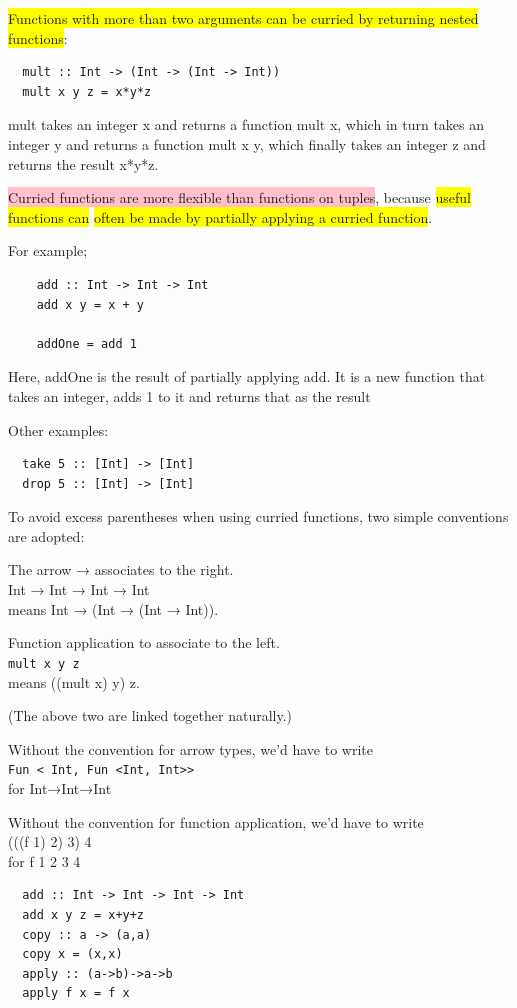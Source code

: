 \documentclass[tikz,border=10pt]{project_plan}
\begin{document}
\colorbox{yellow}{Functions with more than two arguments can be curried
  by returning nested functions}:
\begin{lstlisting}
  mult :: Int -> (Int -> (Int -> Int))
  mult x y z = x*y*z
\end{lstlisting}

mult takes an integer x and returns a function mult x,
which in turn takes an integer y and returns a function
mult x y, which finally takes an integer z and returns
the result x*y*z.

\colorbox{pink}{Curried functions are more flexible than functions on
  tuples}, because \colorbox{yellow}{useful functions can} \colorbox{yellow}{often be made by
  partially applying a curried function}.

For example;
\begin{lstlisting}
    add :: Int -> Int -> Int
    add x y = x + y

    addOne = add 1
\end{lstlisting}
Here, addOne is the result of partially applying add. It is a new function that
takes an integer, adds 1 to it and returns that as the result

Other examples:
\begin{lstlisting}
  take 5 :: [Int] -> [Int]
  drop 5 :: [Int] -> [Int]
\end{lstlisting}

To avoid excess parentheses when using curried functions,
two simple conventions are adopted:

The arrow → associates to the right.\\
Int → Int → Int → Int\\
means Int → (Int → (Int → Int)).

Function application to associate to the left.\\
\lstinline|mult x y z|\\
means ((mult x) y) z.

(The above two are linked together naturally.)

Without the convention for arrow types, we’d have to write\\
\lstinline{Fun < Int, Fun <Int, Int>>}\\
for Int→Int→Int

Without the convention for function application, we’d have to write\\
(((f 1) 2) 3) 4\\
for f 1 2 3 4

\begin{lstlisting}
  add :: Int -> Int -> Int -> Int
  add x y z = x+y+z
  copy :: a -> (a,a)
  copy x = (x,x)
  apply :: (a->b)->a->b
  apply f x = f x
\end{lstlisting}
\end{document}
